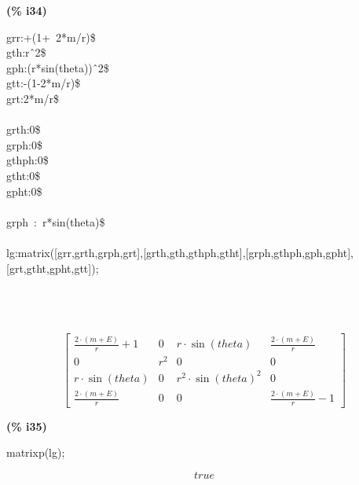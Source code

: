 \documentclass[fleqn]{article}
\begin{document}
\noindent%



\noindent
\begin{minipage}[t]{4.000000em}\color{red}\bfseries
(\% i34)	
\end{minipage}
\begin{minipage}[t]{\textwidth}\color{blue}
grr:+(1+\ 2*m/r)\$\\
gth:r\^\ 2\$\\
gph:(r*sin(theta))\^\ 2\$\\
gtt:-(1-2*m/r)\$\\
grt:2*m/r\$\\
\\
grth:0\$\\
grph:0\$\\
gthph:0\$\\
gtht:0\$\\
gpht:0\$\\
\\
grph\ :\ r*sin(theta)\$\\
\\
lg:matrix([grr,grth,grph,grt],[grth,gth,gthph,gtht],[grph,gthph,gph,gpht],[grt,gtht,gpht,gtt]);\ \ \ \ \ \ \ \ \ \ \ \ \ \ \ \ \ \ \ \ \ \ \ \ \ \ \ \ \ \ \ \ \ \ \ \ \ \ \ \ \ \ \ \ \ \ \ \ \ \ \ \ \ \ \ \ \ \ \ \ \ \ \ \ \ \ \ \ \ \ \ \ \ \ \ \ \ \ \ \ \ \ \ \ \ \ \ \ \ \ \ \ \ \ \ \ \ \ \ \ \ \ \ \ \ \ \ \ \ \ \ \ \ \ \ \ \ \ \ \ \ \ \ \ \ \ \ \ \ \ \ \ \ \ \ \ \ \ \ \ \ \ \ \ \ \ \ \ \ \ \ \ \ \ \ \ \ \ \ \ \ \ \ \ \ \ \ \ \ \ \ \ \ \ \ \ \ \ \ \ \ \ \ \ \ \ \ \ \ \ \ \ \ \ \ \ \ \ \ \ \ 
\end{minipage}
\[\displaystyle \tag{\% o34} 
\begin{bmatrix}\frac{2\mathop{\ensuremath{\cdot}}\left( m\mathop{+}E\right) }{r}\mathop{+}1 & 0 & r\mathop{\ensuremath{\cdot}}\sin{(theta)} & \frac{2\mathop{\ensuremath{\cdot}}\left( m\mathop{+}E\right) }{r}\\
0 & {{r}^{2}} & 0 & 0\\
r\mathop{\ensuremath{\cdot}}\sin{(theta)} & 0 & {{r}^{2}}\mathop{\ensuremath{\cdot}}{{\sin{(theta)}}^{2}} & 0\\
\frac{2\mathop{\ensuremath{\cdot}}\left( m\mathop{+}E\right) }{r} & 0 & 0 & \frac{2\mathop{\ensuremath{\cdot}}\left( m\mathop{+}E\right) }{r}\mathop{-}1\end{bmatrix}\mbox{}
\]


\noindent
\begin{minipage}[t]{4.000000em}\color{red}\bfseries
(\% i35)	
\end{minipage}
\begin{minipage}[t]{\textwidth}\color{blue}
matrixp(lg);
\end{minipage}
\[\displaystyle \tag{\% o35} 
true\mbox{}
\]
\end{document}
